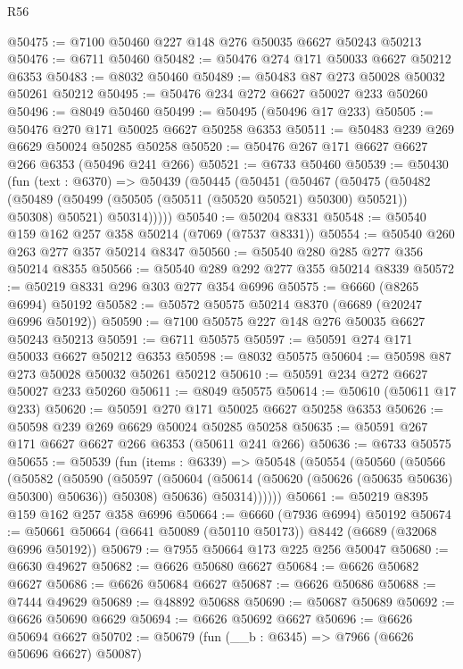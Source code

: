 \begin{lexlean}{R56}
\begin{coremodule}
@50475 := @7100 @50460 @227 @148 @276 @50035 @6627 @50243 @50213
@50476 := @6711 @50460
@50482 := @50476 @274 @171 @50033 @6627 @50212 @6353
@50483 := @8032 @50460
@50489 := @50483 @87 @273 @50028 @50032 @50261 @50212
@50495 := @50476 @234 @272 @6627 @50027 @233 @50260
@50496 := @8049 @50460
@50499 := @50495 (@50496 @17 @233)
@50505 := @50476 @270 @171 @50025 @6627 @50258 @6353
@50511 := @50483 @239 @269 @6629 @50024 @50285 @50258
@50520 := @50476 @267 @171 @6627 @6627 @266 @6353 (@50496 @241 @266)
@50521 := @6733 @50460
@50539 := @50430
    (fun (text : @6370) =>
    @50439
      (@50445
        (@50451
          (@50467
            (@50475
              (@50482
                (@50489 (@50499 (@50505 (@50511 (@50520 @50521) @50300) @50521)) @50308)
                @50521)
              @50314)))))
@50540 := @50204 @8331
@50548 := @50540 @159 @162 @257 @358 @50214 (@7069 (@7537 @8331))
@50554 := @50540 @260 @263 @277 @357 @50214 @8347
@50560 := @50540 @280 @285 @277 @356 @50214 @8355
@50566 := @50540 @289 @292 @277 @355 @50214 @8339
@50572 := @50219 @8331 @296 @303 @277 @354 @6996
@50575 := @6660 (@8265 @6994) @50192
@50582 := @50572 @50575 @50214 @8370 (@6689 (@20247 @6996 @50192))
@50590 := @7100 @50575 @227 @148 @276 @50035 @6627 @50243 @50213
@50591 := @6711 @50575
@50597 := @50591 @274 @171 @50033 @6627 @50212 @6353
@50598 := @8032 @50575
@50604 := @50598 @87 @273 @50028 @50032 @50261 @50212
@50610 := @50591 @234 @272 @6627 @50027 @233 @50260
@50611 := @8049 @50575
@50614 := @50610 (@50611 @17 @233)
@50620 := @50591 @270 @171 @50025 @6627 @50258 @6353
@50626 := @50598 @239 @269 @6629 @50024 @50285 @50258
@50635 := @50591 @267 @171 @6627 @6627 @266 @6353 (@50611 @241 @266)
@50636 := @6733 @50575
@50655 := @50539
    (fun (items : @6339) =>
    @50548
      (@50554
        (@50560
          (@50566
            (@50582
              (@50590
                (@50597
                  (@50604 (@50614 (@50620 (@50626 (@50635 @50636) @50300) @50636)) @50308)
                  @50636)
                @50314))))))
@50661 := @50219 @8395 @159 @162 @257 @358 @6996
@50664 := @6660 (@7936 @6994) @50192
@50674 := @50661 @50664 (@6641 @50089 (@50110 @50173)) @8442 (@6689 (@32068 @6996 @50192))
@50679 := @7955 @50664 @173 @225 @256 @50047
@50680 := @6630 @49627
@50682 := @6626 @50680 @6627
@50684 := @6626 @50682 @6627
@50686 := @6626 @50684 @6627
@50687 := @6626 @50686
@50688 := @7444 @49629
@50689 := @48892 @50688
@50690 := @50687 @50689
@50692 := @6626 @50690 @6629
@50694 := @6626 @50692 @6627
@50696 := @6626 @50694 @6627
@50702 := @50679 (fun (__b : @6345) => @7966 (@6626 @50696 @6627) @50087)

\end{coremodule}
\end{lexlean}
